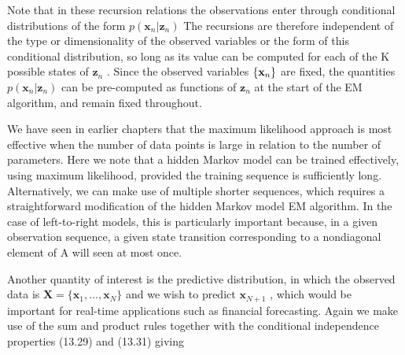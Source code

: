 \documentclass[
  10
]{article}
\begin{document}
Note that in these recursion relations the observations enter through
conditional distributions of the form
\(p ( \mathbf { x } _ { n } | \mathbf { z } _ { n } )\) The recursions
are therefore independent of the type or dimensionality of the observed
variables or the form of this conditional distribution, so long as its
value can be computed for each of the K possible states of
\(\mathbf { z } _ { n }\) . Since the observed variables
\(\left\{ { \bf x } _ { n } \right\}\) are fixed, the quantities
\(p ( \mathbf { x } _ { n } | \mathbf { z } _ { n } )\) can be
pre-computed as functions of \(\mathbf { z } _ { n }\) at the start of
the EM algorithm, and remain fixed throughout.

We have seen in earlier chapters that the maximum likelihood approach is
most effective when the number of data points is large in relation to
the number of parameters. Here we note that a hidden Markov model can be
trained effectively, using maximum likelihood, provided the training
sequence is sufficiently long. Alternatively, we can make use of
multiple shorter sequences, which requires a straightforward
modification of the hidden Markov model EM algorithm. In the case of
left-to-right models, this is particularly important because, in a given
observation sequence, a given state transition corresponding to a
nondiagonal element of A will seen at most once.

Another quantity of interest is the predictive distribution, in which
the observed data is
\(\mathbf { X } = \{ \mathbf { x } _ { 1 } , \ldots , \mathbf { x } _ { N } \}\)
and we wish to predict \(\mathbf { x } _ { N + 1 }\) , which would be
important for real-time applications such as financial forecasting.
Again we make use of the sum and product rules together with the
conditional independence properties (13.29) and (13.31) giving
\end{document}
